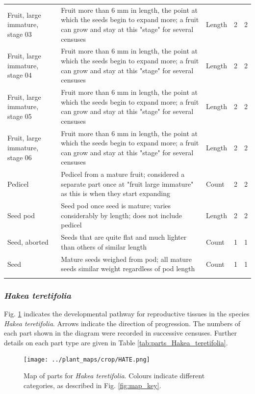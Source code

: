 \documentclass[10pt,twoside]{article}\usepackage[]{graphicx}\usepackage[]{color}
\begin{document}
\begin{longtable}{p{4.5cm}p{6cm}p{2cm}p{1cm}p{1cm}}
  Fruit, large immature, stage 03 & Fruit more than 6 mm in length, the point at which the seeds begin to expand more; a fruit can grow and stay at this "stage" for several censuses & Length & 2 &   2 \\ 
  Fruit, large immature, stage 04 & Fruit more than 6 mm in length, the point at which the seeds begin to expand more; a fruit can grow and stay at this "stage" for several censuses & Length & 2 &   2 \\ 
  Fruit, large immature, stage 05 & Fruit more than 6 mm in length, the point at which the seeds begin to expand more; a fruit can grow and stay at this "stage" for several censuses & Length & 2 &   2 \\ 
  Fruit, large immature, stage 06 & Fruit more than 6 mm in length, the point at which the seeds begin to expand more; a fruit can grow and stay at this "stage" for several censuses & Length & 2 &   2 \\ 
  Pedicel & Pedicel from a mature fruit; considered a separate part once at "fruit large immature" as this is when they start expanding & Count & 2 &   2 \\ 
  Seed pod & Seed pod once seed is mature; varies considerably by length; does not include pedicel & Length & 2 &   2 \\ 
  Seed, aborted & Seeds that are quite flat and much lighter than others of similar length & Count & 1 &   1 \\ 
  Seed & Mature seeds weighed from pod; all mature seeds similar weight regardless of pod length & Count & 1 &   1 \\ 
   \hline
\hline
\label{tab:parts_Grevillea_speciosa}
\end{longtable}
\endgroup


\clearpage

\subsubsection{\emph{Hakea teretifolia}}

Fig. \ref{fig:map_Hakea_teretifolia} indicates the developmental pathway for reproductive tissues in the species \emph{Hakea teretifolia}. Arrows indicate the direction of progression.  The numbers of each part shown in the diagram were recorded in successive censuses. Further details on each part type are given in Table \ref{tab:parts_Hakea_teretifolia}.

\begin{figure}[h]
\centering
\texttt{[image: ../plant\_maps/crop/HATE.png]}
\caption{Map of parts for \emph{Hakea teretifolia}. Colours indicate different categories, as described in Fig. \ref{fig:map_key}.}
\label{fig:map_Hakea_teretifolia}
\end{figure}
\end{document}

